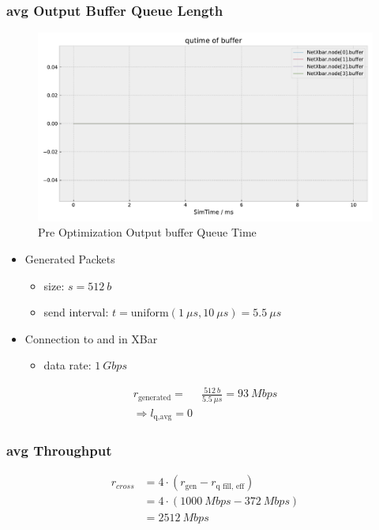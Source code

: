 \documentclass[]{scrartcl}
\begin{document}
    \subsubsection{avg Output Buffer Queue Length}
        \begin{figure}[ht]
            \centering
            \includegraphics[width=\columnwidth, page=6]{../../python/results/preopt-General-0}
            \caption{Pre Optimization Output buffer Queue Time}%
            \label{fig:preopt-output-qtime}
        \end{figure}
        \begin{itemize}
            \item Generated Packets
                \begin{itemize}
                    \item size: $ s = \SI{512}{b}$
                    \item send interval: $ t = \text{uniform}(\SI{1}{\mu s}, \SI{10}{\mu s}) = \SI{5.5}{\mu s}$
                \end{itemize}
            \item Connection to and in XBar
                \begin{itemize}
                    \item data rate: $\SI{1}{Gbps}$
                \end{itemize}
        \end{itemize}
        \begin{align}
            r_\text{generated} =& \frac{\SI{512}{b}}{\SI{5.5}{\mu s}} = \SI{93}{Mbps}\\
            \Rightarrow l_\text{q,avg} = 0
        \end{align}

    \subsubsection{avg Throughput}
        \begin{align}
            r_{cross} &= 4\cdot\left( r_\text{gen} - r_\text{q fill, eff} \right)\\
                      &= 4 \cdot \left( \SI{1000}{Mbps} - \SI{372}{Mbps}\right)\\
                      &= \SI{2512}{Mbps}
        \end{align}
\end{document}
